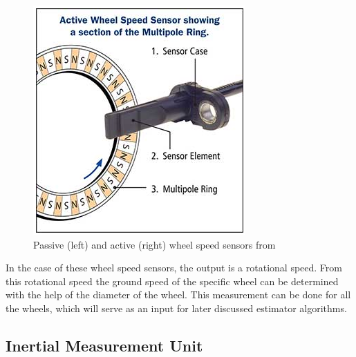 \begin{figure}[htbp]
\begin{minipage}{0.45\textwidth}
        \includegraphics[width=\linewidth]{images/active_wheel_speed_sensor.png}
    \end{minipage}
    \label{fig:wheel_speed_sensors}
    \caption{Passive (left) and active (right) wheel speed sensors from \cite{wheel_speed_sensors}}
\end{figure}
\FloatBarrier

In the case of these wheel speed sensors, the output is a rotational speed. From this rotational speed the ground speed of the specific wheel can be determined with the help of the diameter of the wheel. This measurement can be done for all the wheels, which will serve as an input for later discussed estimator algorithms.


\subsection{Inertial Measurement Unit}

